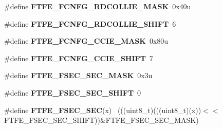 \begin{DoxyCompactItemize}
\item 
\hypertarget{group___f_t_f_e___register___masks_gad401ef9e82184d706725e195999b1b6d}{}\#define {\bfseries F\+T\+F\+E\+\_\+\+F\+C\+N\+F\+G\+\_\+\+R\+D\+C\+O\+L\+L\+I\+E\+\_\+\+M\+A\+S\+K}~0x40u\label{group___f_t_f_e___register___masks_gad401ef9e82184d706725e195999b1b6d}

\item 
\hypertarget{group___f_t_f_e___register___masks_gad7f01bb5b4a2822faeec68491b844993}{}\#define {\bfseries F\+T\+F\+E\+\_\+\+F\+C\+N\+F\+G\+\_\+\+R\+D\+C\+O\+L\+L\+I\+E\+\_\+\+S\+H\+I\+F\+T}~6\label{group___f_t_f_e___register___masks_gad7f01bb5b4a2822faeec68491b844993}

\item 
\hypertarget{group___f_t_f_e___register___masks_gaff1694ff98f006483492c0e8748caf61}{}\#define {\bfseries F\+T\+F\+E\+\_\+\+F\+C\+N\+F\+G\+\_\+\+C\+C\+I\+E\+\_\+\+M\+A\+S\+K}~0x80u\label{group___f_t_f_e___register___masks_gaff1694ff98f006483492c0e8748caf61}

\item 
\hypertarget{group___f_t_f_e___register___masks_gac794dc0a13a52c3702e799d92141f7f5}{}\#define {\bfseries F\+T\+F\+E\+\_\+\+F\+C\+N\+F\+G\+\_\+\+C\+C\+I\+E\+\_\+\+S\+H\+I\+F\+T}~7\label{group___f_t_f_e___register___masks_gac794dc0a13a52c3702e799d92141f7f5}

\item 
\hypertarget{group___f_t_f_e___register___masks_gad3ce37250b2d1b59816d2771ef828f7d}{}\#define {\bfseries F\+T\+F\+E\+\_\+\+F\+S\+E\+C\+\_\+\+S\+E\+C\+\_\+\+M\+A\+S\+K}~0x3u\label{group___f_t_f_e___register___masks_gad3ce37250b2d1b59816d2771ef828f7d}

\item 
\hypertarget{group___f_t_f_e___register___masks_gabb0120ba7f17b8ba8a56d75322e90596}{}\#define {\bfseries F\+T\+F\+E\+\_\+\+F\+S\+E\+C\+\_\+\+S\+E\+C\+\_\+\+S\+H\+I\+F\+T}~0\label{group___f_t_f_e___register___masks_gabb0120ba7f17b8ba8a56d75322e90596}

\item 
\hypertarget{group___f_t_f_e___register___masks_ga8e88430b9482613c0dfc94047b19fdb1}{}\#define {\bfseries F\+T\+F\+E\+\_\+\+F\+S\+E\+C\+\_\+\+S\+E\+C}(x)                                              ~(((uint8\+\_\+t)(((uint8\+\_\+t)(x))$<$$<$F\+T\+F\+E\+\_\+\+F\+S\+E\+C\+\_\+\+S\+E\+C\+\_\+\+S\+H\+I\+F\+T))\&F\+T\+F\+E\+\_\+\+F\+S\+E\+C\+\_\+\+S\+E\+C\+\_\+\+M\+A\+S\+K)\label{group___f_t_f_e___register___masks_ga8e88430b9482613c0dfc94047b19fdb1}


\end{DoxyCompactItemize}
